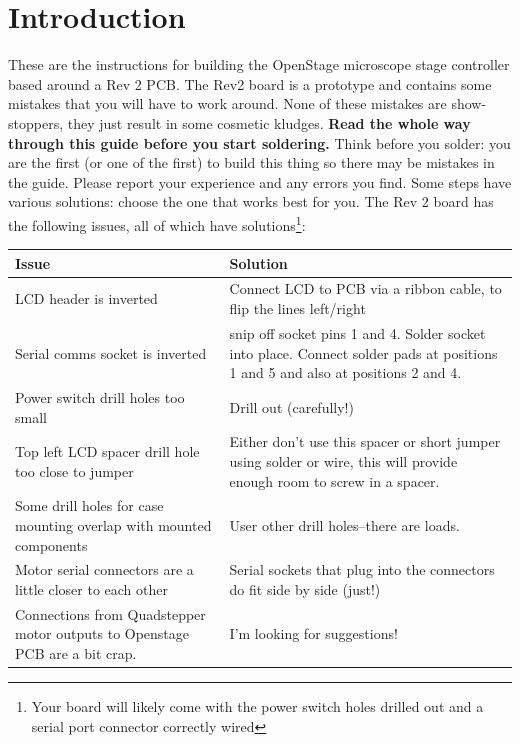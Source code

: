 \documentclass[11pt]{report} %
\begin{document}
\section{Introduction}
These are the instructions for building the OpenStage microscope stage controller based around a Rev 2 PCB. The Rev2 board is a prototype and contains some mistakes that you will have to work around. None of these mistakes are show-stoppers, they just result in some cosmetic kludges. \textbf{Read the whole way through this guide before you start soldering.} Think before you solder: you are the first (or one of the first) to build this thing so there may be mistakes in the guide. Please report your experience and any errors you find. Some steps have various solutions: choose the one that works best for you. The Rev 2 board has the following issues, all of which have solutions\footnote{Your board will likely come with the power switch holes drilled out and a serial port connector correctly wired}:

\vspace{2em}

\begin{tabular}{|p{5.5cm}| p{9cm}|}
\hline
Issue & Solution \\
\hline
\hline
LCD header is inverted & Connect LCD to PCB via a ribbon cable, to flip the lines left/right \\
\hline
Serial comms socket is inverted & snip off socket pins 1 and 4. Solder socket into place. Connect solder pads at positions 1 and 5 and also at positions 2 and 4. \\
\hline
Power switch drill holes too small & Drill out (carefully!)\\
\hline
Top left LCD spacer drill hole too close to jumper & Either don't use this spacer or short jumper using solder or wire, this will provide enough room to screw in a spacer. \\
\hline
Some drill holes for case mounting overlap with mounted components & User other drill holes--there are loads. \\
\hline
Motor serial connectors are a little closer to each other & Serial sockets that plug into the connectors do fit side by side (just!)\\
\hline
Connections from Quadstepper motor outputs to Openstage PCB are a bit crap. & 
I'm looking for suggestions! \\
\hline
\end{tabular}

\clearpage
\end{document}
